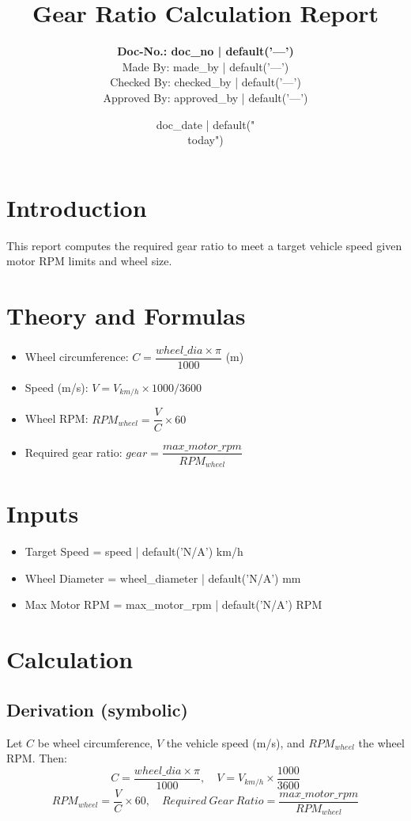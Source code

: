 \documentclass[14pt]{article}
\title{\textbf{Gear Ratio Calculation Report}}
\author{\textbf{Doc-No.: {{ doc_no | default('—') }}}\\
Made By: {{ made_by | default('—') }}\\
Checked By: {{ checked_by | default('—') }}\\
Approved By: {{ approved_by | default('—') }}}
\date{{ doc_date | default("\\today") }}
\begin{document}
\maketitle

\section*{Introduction}
This report computes the required gear ratio to meet a target vehicle speed given motor RPM limits and wheel size.

\section{Theory and Formulas}
\begin{itemize}
  \item Wheel circumference: $C = \dfrac{wheel\_dia \times \pi}{1000}$ (m)
  \item Speed (m/s): $V = V_{km/h} \times 1000 / 3600$
  \item Wheel RPM: $RPM_{wheel} = \dfrac{V}{C} \times 60$
  \item Required gear ratio: $gear = \dfrac{max\_motor\_rpm}{RPM_{wheel}}$
\end{itemize}

\section{Inputs}
\begin{itemize}
  \item Target Speed = {{ speed | default('N/A') }} km/h
  \item Wheel Diameter = {{ wheel_diameter | default('N/A') }} mm
  \item Max Motor RPM = {{ max_motor_rpm | default('N/A') }} RPM
\end{itemize}

\section{Calculation}
\subsection*{Derivation (symbolic)}
Let $C$ be wheel circumference, $V$ the vehicle speed (m/s), and $RPM_{wheel}$ the wheel RPM. Then:
\[ C = \frac{wheel\_dia \times \pi}{1000}, \quad V = V_{km/h} \times \frac{1000}{3600} \]
\[ RPM_{wheel} = \frac{V}{C} \times 60, \quad Required\ Gear\ Ratio = \frac{max\_motor\_rpm}{RPM_{wheel}} \]
\end{document}
